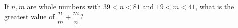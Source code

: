 If $n,m$ are whole numbers with $39<n<81$ and $19<m<41$, what is the greatest value of $\dfrac nm+\dfrac mn$?
